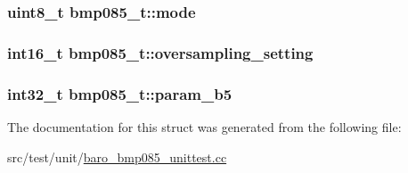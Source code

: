 \hypertarget{structbmp085__t_a4732a903725387a70214f44df99cce18}{
\subsubsection[{mode}]{\setlength{\rightskip}{0pt plus 5cm}uint8\+\_\+t bmp085\+\_\+t\+::mode}}\label{structbmp085__t_a4732a903725387a70214f44df99cce18}
\hypertarget{structbmp085__t_a9af6d243028d82c2249e774ad240f125}{
\subsubsection[{oversampling\+\_\+setting}]{\setlength{\rightskip}{0pt plus 5cm}int16\+\_\+t bmp085\+\_\+t\+::oversampling\+\_\+setting}}\label{structbmp085__t_a9af6d243028d82c2249e774ad240f125}
\hypertarget{structbmp085__t_a52efc2a28cab750a500e80bd812236e6}{
\subsubsection[{param\+\_\+b5}]{\setlength{\rightskip}{0pt plus 5cm}int32\+\_\+t bmp085\+\_\+t\+::param\+\_\+b5}}\label{structbmp085__t_a52efc2a28cab750a500e80bd812236e6}


The documentation for this struct was generated from the following file\+:\begin{DoxyCompactItemize}
\item 
src/test/unit/\hyperlink{baro__bmp085__unittest_8cc}{baro\+\_\+bmp085\+\_\+unittest.\+cc}\end{DoxyCompactItemize}
